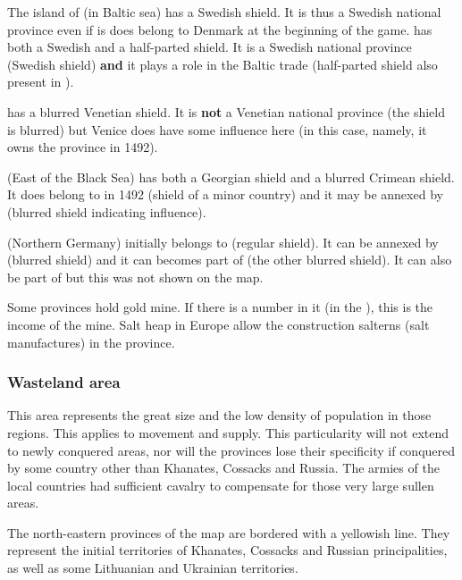 \begin{exemple}[Shields]
  The island of \provinceGotland (in Baltic sea) has a Swedish shield. It is
  thus a Swedish national province even if is does belong to Denmark at the
  beginning of the game. \provinceSkane has both a Swedish and a half-parted
  shield. It is a Swedish national province (Swedish shield) \textbf{and} it
  plays a role in the Baltic trade (half-parted shield also present in
  \seazoneBaltique).

  \provinceKreta has a blurred Venetian shield. It is \textbf{not} a Venetian
  national province (the shield is blurred) but Venice does have some
  influence here (in this case, namely, it owns the province in 1492).

  \provinceKuban (East of the Black Sea) has both a Georgian shield and a
  blurred Crimean shield. It does belong to \paysGeorgie in 1492 (shield of a
  minor country) and it may be annexed by \paysCrimee (blurred shield
  indicating influence).

  \provinceHinterpommern (Northern Germany) initially belongs to
   (regular shield). It can be annexed by \paysHanse
  (blurred shield) and it can becomes part of  (the
  other blurred shield). It can also be part of \paysPommeranie but this was
  not shown on the map.
\end{exemple}

 Some provinces hold gold mine. If there is a number in it
(in the \ROTW), this is the income of the mine.
 Salt heap in Europe allow the construction salterns
(salt manufactures) in the province.%


\subsubsection{Wasteland area}\label{chBasics:Wasteland}
\begin{histoire}
  This area represents the great size and the low density of population in
  those regions. This applies to movement and supply. This particularity will
  not extend to newly conquered areas, nor will the provinces lose their
  specificity if conquered by some country other than Khanates, Cossacks and
  Russia. The armies of the local countries had sufficient cavalry to
  compensate for those very large sullen areas.
\end{histoire}
 The north-eastern provinces of the map are
bordered with a yellowish line. They represent the initial territories of
Khanates, Cossacks and Russian principalities, as well as some Lithuanian and
Ukrainian territories.


